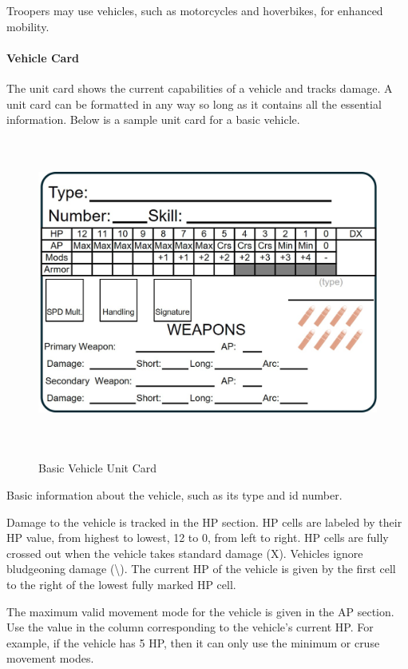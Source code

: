 Troopers may use vehicles, such as motorcycles and hoverbikes, for enhanced mobility.

\paragraph*{Vehicle Card}

The unit card shows the current capabilities of a vehicle and tracks damage.
A unit card can be formatted in any way so long as it contains all the essential information.
Below is a sample unit card for a basic vehicle.

\begin{figure}[H]
  \centering
  \includegraphics[alt='Sample Vehicle', width=5.63in, height=4in]{img/Vehicle.png}
  \caption*{Basic Vehicle Unit Card}
\end{figure}

Basic information about the vehicle, such as its type and id number.

Damage to the vehicle is tracked in the HP section.
HP cells are labeled by their HP value, from highest to lowest, 12 to 0, from left to right.
HP cells are fully crossed out when the vehicle takes standard damage (X).
Vehicles ignore bludgeoning damage (\textbackslash).
The current HP of the vehicle is given by the first cell to the right of the lowest fully marked HP cell.

The maximum valid movement mode for the vehicle is given in the AP section.
Use the value in the column corresponding to the vehicle's current HP.
For example, if the vehicle has 5 HP, then it can only use the minimum or cruse movement modes.

